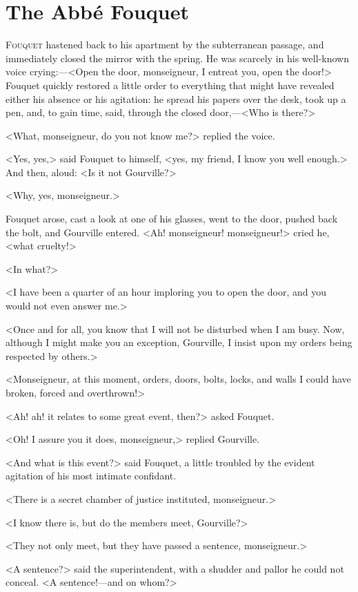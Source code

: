 \chapter{The Abbé Fouquet}

\lettrine{F}{ouquet} hastened back to his apartment by the subterranean passage, and immediately closed the mirror with the spring. He was scarcely in his well-known voice crying:—<Open the door, monseigneur, I entreat you, open the door!> Fouquet quickly restored a little order to everything that might have revealed either his absence or his agitation: he spread his papers over the desk, took up a pen, and, to gain time, said, through the closed door,—<Who is there?>

<What, monseigneur, do you not know me?> replied the voice.

<Yes, yes,> said Fouquet to himself, <yes, my friend, I know you well enough.> And then, aloud: <Is it not Gourville?>

<Why, yes, monseigneur.>

Fouquet arose, cast a look at one of his glasses, went to the door, pushed back the bolt, and Gourville entered. <Ah! monseigneur! monseigneur!> cried he, <what cruelty!>

<In what?>

<I have been a quarter of an hour imploring you to open the door, and you would not even answer me.>

<Once and for all, you know that I will not be disturbed when I am busy. Now, although I might make you an exception, Gourville, I insist upon my orders being respected by others.>

<Monseigneur, at this moment, orders, doors, bolts, locks, and walls I could have broken, forced and overthrown!>

<Ah! ah! it relates to some great event, then?> asked Fouquet.

<Oh! I assure you it does, monseigneur,> replied Gourville.

<And what is this event?> said Fouquet, a little troubled by the evident agitation of his most intimate confidant.

<There is a secret chamber of justice instituted, monseigneur.>

<I know there is, but do the members meet, Gourville?>

<They not only meet, but they have passed a sentence, monseigneur.>

<A sentence?> said the superintendent, with a shudder and pallor he could not conceal. <A sentence!—and on whom?>

